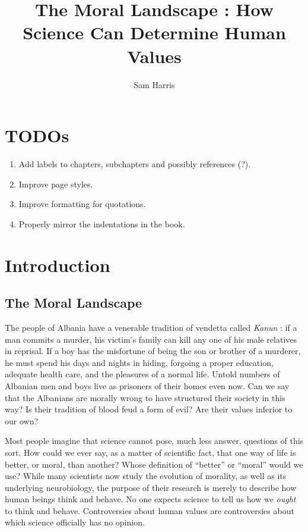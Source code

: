 \documentclass[a4paper,14pt]{extarticle}
\title{The Moral Landscape : How Science Can Determine Human Values}
\author{Sam Harris}
\begin{document}
\maketitle

\newpage
\tableofcontents

\newpage
\section{TODOs}

\begin{enumerate}
      \item Add labels to chapters, subchapters and possibly references (?).
      \item Improve page styles.
      \item Improve formatting for quotations.
      \item Properly mirror the indentations in the book.
\end{enumerate}

\newpage
\section{Introduction}

\subsection{The Moral Landscape}

The people of Albania have a venerable tradition of vendetta called \textit{Kanun} :
if a man commits a murder, his victim's family can kill any one of his male relatives in reprisal.
If a boy has the misfortune of being the son or brother of a murderer, he must spend his days and nights in hiding, forgoing a proper education, adequate health care, and the pleasures of a normal life.
Untold numbers of Albanian men and boys live as prisoners of their homes even now.
Can we say that the Albanians are morally wrong to have structured their society in this way?
Is their tradition of blood feud a form of evil?
Are their values inferior to our own?

Most people imagine that science cannot pose, much less answer, questions of this sort.
How could we ever say, as a matter of scientific fact, that one way of life is better, or moral, than another?
Whose definition of ``better'' or ``moral'' would we use?
While many scientists now study the evolution of morality, as well as its underlying neurobiology, the purpose of their research is merely to describe how human beings think and behave.
No one expects science to tell us how we \textit{ought} to think and behave.
Controversies about human values are controversies about which science officially has no opinion.
\end{document}
